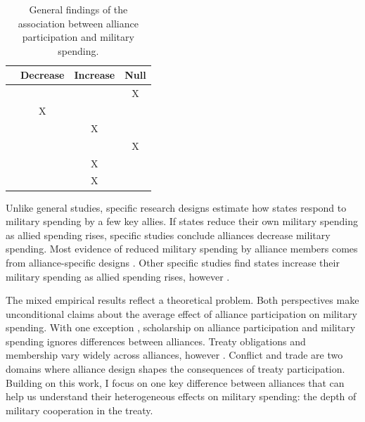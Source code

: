 \documentclass[12pt]{article}
\begin{document}
\begin{table}[hbt!]
\begin{center}
\begin{tabular}{lccc}
     & Decrease & Increase & Null \\
\hline
\citet{MostSiverson1987} &  &  & X \\
\citet{Conybeare1994} & X & &  \\
\citet{Diehl1994} &  & X &  \\
\citet{Goldsmith2003} &  &  & X \\
\citet{MorganPalmer2006} &  & X & \\ 
\citet{QuirozFlores2011} &  & X &  \\ 
\hline
\end{tabular}
\caption{General findings of the association between alliance participation and military spending.}
\label{tab:results-sum}
\end{center} 
\end{table}


Unlike general studies, specific research designs estimate how states respond to military spending by a few key allies. 
If states reduce their own military spending as allied spending rises, specific studies conclude alliances decrease military spending. 
Most evidence of reduced military spending by alliance members comes from alliance-specific designs \citep{BarnettLevy1991, Morrow1993, Sorokin1994, PluemperNeumayer2015, GeorgeSandler2017}.
Other specific studies find states increase their military spending as allied spending rises, however \citep{ConybeareSandler1990, Chenetal1996}. 


The mixed empirical results reflect a theoretical problem. 
Both perspectives make unconditional claims about the average effect of alliance participation on military spending.  
With one exception \citep{DigiuseppePoast2016}, scholarship on alliance participation and military spending ignores differences between alliances.
Treaty obligations and membership vary widely across alliances, however \citep{Leedsetal2002}. 
Conflict \citep{Leeds2003, Benson2012} and trade \citep{Long2003, LongLeeds2006} are two domains where alliance design shapes the consequences of treaty participation. 
Building on this work, I focus on one key difference between alliances that can help us understand their heterogeneous effects on military spending: the depth of military cooperation in the treaty.
\end{document}
